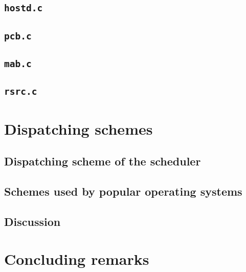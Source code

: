 \documentclass[12pt]{article}
\begin{document}
\subsection{\tt{hostd.c}}

\subsection{\tt{pcb.c}}

\subsection{\tt{mab.c}}

\subsection{\tt{rsrc.c}}

\section{Dispatching schemes}

\subsection{Dispatching scheme of the scheduler}

\subsection{Schemes used by popular operating systems}

\subsection{Discussion}

\section{Concluding remarks}



\end{document}
